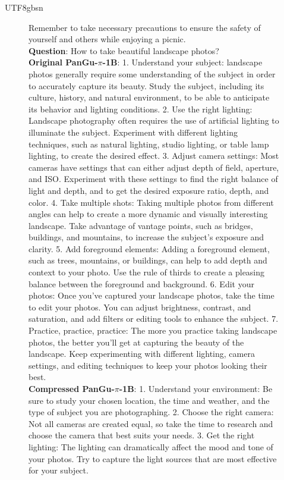 \documentclass{article}
\theoremstyle{plain}
\theoremstyle{definition}
\theoremstyle{remark}
\begin{document}
\begin{CJK}{UTF8}{gbsn}
\begin{figure}[t]
\begin{center}
\begin{tcolorbox}[colback=gray!10,%
			colframe=black,%
			width=16cm,%
			arc=1mm, auto outer arc,
			boxrule=0.8pt,
			]
Remember to take necessary precautions to ensure the safety of yourself and others while enjoying a picnic.\\
			\textbf{Question}: How to take beautiful landscape photos?\\
			\textbf{Original PanGu-$\pi$-1B}: 1. Understand your subject: landscape photos generally require some understanding of the subject in order to accurately capture its beauty. Study the subject, including its culture, history, and natural environment, to be able to anticipate its behavior and lighting conditions.
			2. Use the right lighting: Landscape photography often requires the use of artificial lighting to illuminate the subject. Experiment with different lighting techniques, such as natural lighting, studio lighting, or table lamp lighting, to create the desired effect.
			3. Adjust camera settings: Most cameras have settings that can either adjust depth of field, aperture, and ISO. Experiment with these settings to find the right balance of light and depth, and to get the desired exposure ratio, depth, and color.
			4. Take multiple shots: Taking multiple photos from different angles can help to create a more dynamic and visually interesting landscape. Take advantage of vantage points, such as bridges, buildings, and mountains, to increase the subject's exposure and clarity.
			5. Add foreground elements: Adding a foreground element, such as trees, mountains, or buildings, can help to add depth and context to your photo. Use the rule of thirds to create a pleasing balance between the foreground and background.
			6. Edit your photos: Once you've captured your landscape photos, take the time to edit your photos. You can adjust brightness, contrast, and saturation, and add filters or editing tools to enhance the subject.
			7. Practice, practice, practice: The more you practice taking landscape photos, the better you'll get at capturing the beauty of the landscape. Keep experimenting with different lighting, camera settings, and editing techniques to keep your photos looking their best.\\
			\textbf{Compressed PanGu-$\pi$-1B}: 1. Understand your environment: Be sure to study your chosen location, the time and weather, and the type of subject you are photographing.
			2. Choose the right camera: Not all cameras are created equal, so take the time to research and choose the camera that best suits your needs.
			3. Get the right lighting: The lighting can dramatically affect the mood and tone of your photos. Try to capture the light sources that are most effective for your subject.

\end{tcolorbox}
\end{center}
\end{figure}
\end{CJK}
\end{document}
